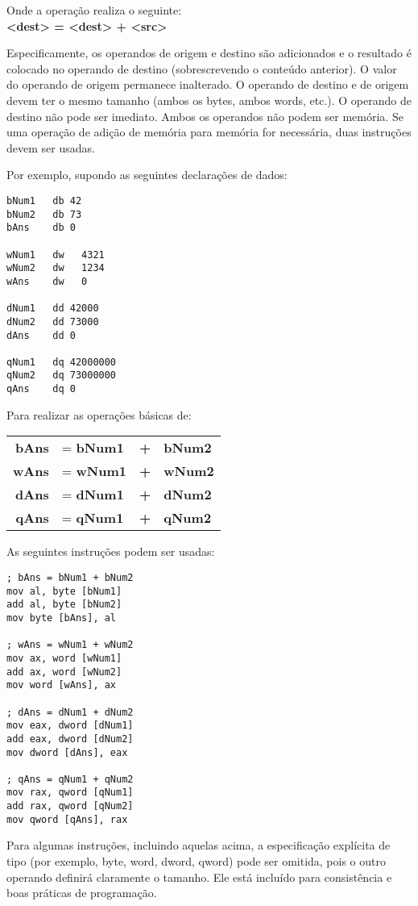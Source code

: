 Onde a operação realiza o seguinte:\\
\textbf{<dest> = <dest> + <src>}

Especificamente, os operandos de origem e destino são adicionados e o resultado é colocado no operando de destino (sobrescrevendo o conteúdo anterior). O valor do operando de origem permanece inalterado. O operando de destino e de origem devem ter o mesmo tamanho (ambos os bytes, ambos words, etc.). O operando de destino não pode ser imediato. Ambos os operandos não podem ser memória. Se uma operação de adição de memória para memória for necessária, duas instruções devem ser usadas.

Por exemplo, supondo as seguintes declarações de dados:
\begin{lstlisting}
bNum1   db 42
bNum2   db 73
bAns    db 0

wNum1   dw   4321
wNum2   dw   1234
wAns    dw   0

dNum1   dd 42000
dNum2   dd 73000
dAns    dd 0

qNum1   dq 42000000
qNum2   dq 73000000
qAns    dq 0
\end{lstlisting}

Para realizar as operações básicas de:

\begin{tabular}{rlcl}
	\textbf{bAns} & = \textbf{bNum1} &\textbf{+}& \textbf{bNum2}\\
	\textbf{wAns} & = \textbf{wNum1} &\textbf{+}& \textbf{wNum2}\\
	\textbf{dAns} & = \textbf{dNum1} &\textbf{+}& \textbf{dNum2}\\
	\textbf{qAns} & = \textbf{qNum1} &\textbf{+}& \textbf{qNum2}\\
\end{tabular}

As seguintes instruções podem ser usadas:
\begin{lstlisting}
; bAns = bNum1 + bNum2
mov al, byte [bNum1]
add al, byte [bNum2]
mov byte [bAns], al

; wAns = wNum1 + wNum2
mov ax, word [wNum1]
add ax, word [wNum2]
mov word [wAns], ax

; dAns = dNum1 + dNum2
mov eax, dword [dNum1]
add eax, dword [dNum2]
mov dword [dAns], eax

; qAns = qNum1 + qNum2
mov rax, qword [qNum1]
add rax, qword [qNum2]
mov qword [qAns], rax
\end{lstlisting}

Para algumas instruções, incluindo aquelas acima, a especificação explícita de tipo  (por exemplo, byte, word, dword, qword) pode ser omitida, pois o outro operando definirá claramente o tamanho. Ele está incluído para consistência e boas práticas de programação.

